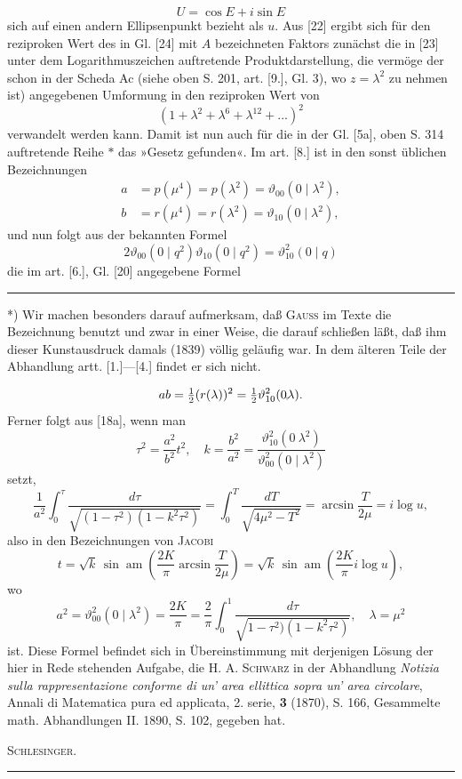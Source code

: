 \[U=\cos E+i\sin E\]
\noindent sich auf einen andern Ellipsenpunkt bezieht als $u$. Aus [22] ergibt sich für den reziproken Wert des in Gl. [24] mit $A$ bezeichneten Faktors zunächst die in [23] unter dem Logarithmuszeichen auftretende Produktdarstellung, die vermöge der schon in der Scheda Ac (siehe oben S. 201, art. [9.], Gl. 3), wo $z=\lambda^2$ zu nehmen ist) angegebenen Umformung in den reziproken Wert von
\[(1+\lambda^2+\lambda^6+\lambda^{12}+{.}{.}{.})^2\]
\noindent verwandelt werden kann. Damit ist nun auch für die in der Gl. [5a], oben S. 314 auftretende Reihe $\ast$ das »Gesetz gefunden«. Im art. [8.] ist in den sonst üblichen Bezeichnungen
\[\begin{aligned}
a&=p(\mu^4)=p(\lambda^2)=\vartheta_{00}(0\mid\lambda^2),\\
b&=r(\mu^4)=r(\lambda^2)=\vartheta_{10}(0\mid\lambda^2),
\end{aligned}\]
\noindent und nun folgt aus der bekannten Formel
\[2\vartheta_{00}(0\mid q^2)\vartheta_{10}(0\mid q^2)=\vartheta_{10}^2(0\mid q)\]
\noindent die im art. [6.], Gl. [20] angegebene Formel
\par\bigskip\noindent\rule{.25\linewidth}{.4pt}\par\smallskip
{\small\par\indent **) Wir machen besonders darauf aufmerksam, daß \textsc{Gauss} im Texte die Bezeichnung  benutzt und zwar in einer Weise, die darauf schließen läßt, daß ihm dieser Kunstausdruck damals (1839) völlig geläufig war. In dem älteren Teile der Abhandlung artt. [1.]---[4.] findet er sich nicht.\par}
\clearpage{}
\[ab=\tfrac12(r(\lambda))^2=\tfrac12\vartheta_{10}^2(0\mathord{\raisebox{-.3ex}{\rule{.3pt}{.6ex}}}\lambda).\]
\noindent Ferner folgt aus [18a], wenn man
\[\tau^2=\frac{a^2}{b^2}t^2,\quad k=\frac{b^2}{a^2}=\frac{\vartheta_{10}^2(0\ \lambda^2)}{\vartheta_{00}^2(0\mid\lambda^2)}\]
\noindent setzt,
\[\frac1{a^2}\int_0^\tau\frac{d\tau}{\sqrt{(1-\tau^2)(1-k^2\tau^2)}}=\int_0^T\frac{dT}{\sqrt{4\mu^2-T^2}}=\arcsin\frac T{2\mu}=i\log u,\]
\noindent also in den Bezeichnungen von \textsc{Jacobi}
\[t=\sqrt{k}\,\sin\operatorname{am}\left(\frac{2K}\pi\arcsin\frac T{2\mu}\right)=\sqrt{k}\,\sin\operatorname{am}\left(\frac{2K}\pi i\log u\right),\]
\noindent wo
\[a^2=\vartheta_{00}^2(0\mid\lambda^2)=\frac{2K}\pi=\frac2\pi\int_0^1\frac{d\tau}{\sqrt{1-\tau^2)(1-k^2\tau^2)}},\quad\lambda=\mu^2\]
\noindent ist. Diese Formel befindet sich in Übereinstimmung mit derjenigen Lösung der hier in Rede stehenden Aufgabe, die H. A. \textsc{Schwarz} in der Abhandlung \textit{Notizia sulla rappresentazione conforme di un’ area ellittica sopra un’ area circolare}, Annali di Matematica pura ed applicata, 2. serie, \textbf{3} (1870), S. 166, Gesammelte math. Abhandlungen II. 1890, S. 102, gegeben hat.
\begin{flushright}\textsc{Schlesinger.}\end{flushright}
\par\bigskip\begin{center}\rule{.25\linewidth}{.4pt}\end{center}
\clearpage
\endgroup
